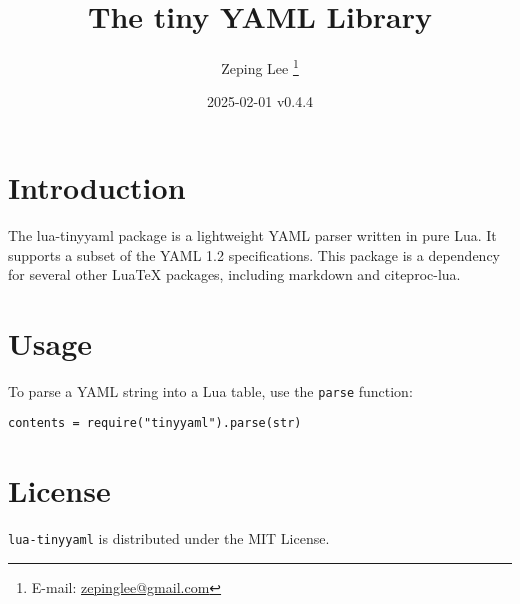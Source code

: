 \documentclass{l3doc}
\begin{document}
\title{The tiny YAML Library}

\author{%
  Zeping Lee%
  \thanks{%
    E-mail:
    \href{mailto:zepinglee@gmail.com}
      {zepinglee@gmail.com}%
  }%
}

\date{2025-02-01 v0.4.4}

\maketitle

\begin{documentation}

\section{Introduction}

The \textsf{lua-tinyyaml} package is a lightweight YAML parser written in pure Lua.
It supports a subset of the YAML 1.2 specifications.
This package is a dependency for several other LuaTeX packages, including \textsf{markdown} and \textsf{citeproc-lua}.


\section{Usage}

To parse a YAML string into a Lua table, use the \texttt{parse} function:

\begin{lstlisting}[language={[5.3]Lua}, basicstyle=\ttfamily]
contents = require("tinyyaml").parse(str)
\end{lstlisting}


\section{License}

\texttt{lua-tinyyaml} is distributed under the MIT License.


\end{documentation}
\end{document}
